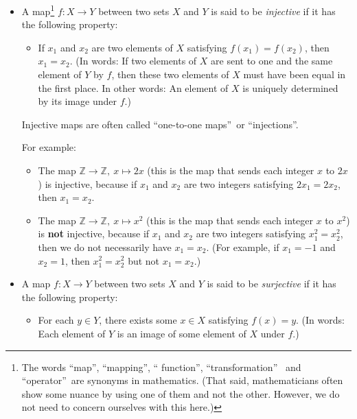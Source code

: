 \documentclass[numbers=enddot,12pt,final,onecolumn,notitlepage]{scrartcl}%
\theoremstyle{definition}
\begin{document}
\begin{itemize}
\item A map\footnote{The words \textquotedblleft map\textquotedblright,
\textquotedblleft mapping\textquotedblright, \textquotedblleft
function\textquotedblright, \textquotedblleft transformation\textquotedblright%
\ and \textquotedblleft operator\textquotedblright\ are synonyms in
mathematics. (That said, mathematicians often show some nuance by using one of
them and not the other. However, we do not need to concern ourselves with this
here.)} $f:X\rightarrow Y$ between two sets $X$ and $Y$ is said to be
\textit{injective} if it has the following property:

\begin{itemize}
\item If $x_{1}$ and $x_{2}$ are two elements of $X$ satisfying $f\left(
x_{1}\right)  =f\left(  x_{2}\right)  $, then $x_{1}=x_{2}$. (In words: If two
elements of $X$ are sent to one and the same element of $Y$ by $f$, then these
two elements of $X$ must have been equal in the first place. In other words:
An element of $X$ is uniquely determined by its image under $f$.)
\end{itemize}

Injective maps are often called \textquotedblleft one-to-one
maps\textquotedblright\ or \textquotedblleft injections\textquotedblright.

For example:

\begin{itemize}
\item The map $\mathbb{Z}\rightarrow\mathbb{Z},\ x\mapsto2x$ (this is the map
that sends each integer $x$ to $2x$) is injective, because if $x_{1}$ and
$x_{2}$ are two integers satisfying $2x_{1}=2x_{2}$, then $x_{1}=x_{2}$.

\item The map $\mathbb{Z}\rightarrow\mathbb{Z},\ x\mapsto x^{2}$ (this is the
map that sends each integer $x$ to $x^{2}$) is \textbf{not} injective, because
if $x_{1}$ and $x_{2}$ are two integers satisfying $x_{1}^{2}=x_{2}^{2}$, then
we do not necessarily have $x_{1}=x_{2}$. (For example, if $x_{1}=-1$ and
$x_{2}=1$, then $x_{1}^{2}=x_{2}^{2}$ but not $x_{1}=x_{2}$.)
\end{itemize}

\item A map $f:X\rightarrow Y$ between two sets $X$ and $Y$ is said to be
\textit{surjective} if it has the following property:

\begin{itemize}
\item For each $y\in Y$, there exists some $x\in X$ satisfying $f\left(
x\right)  =y$. (In words: Each element of $Y$ is an image of some element of
$X$ under $f$.)
\end{itemize}


\end{itemize}
\end{document}
